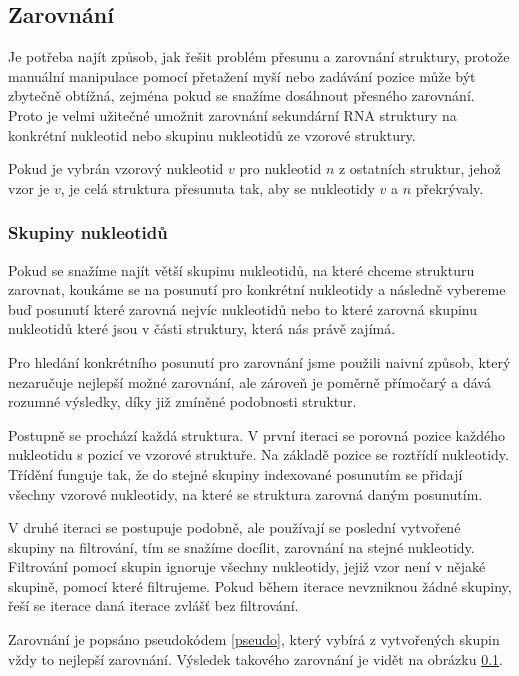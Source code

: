 \subsection{Zarovnání} \label{zarovnani}

Je potřeba najít způsob, jak řešit problém přesunu a zarovnání struktury,
protože manuální manipulace pomocí přetažení myší nebo zadávání pozice může být
zbytečně obtížná, zejména pokud se snažíme dosáhnout přesného zarovnání. Proto
je velmi užitečné umožnit zarovnání sekundární RNA struktury na konkrétní
nukleotid nebo skupinu nukleotidů ze vzorové struktury. 

Pokud je vybrán vzorový nukleotid $v$ pro nukleotid $n$ z ostatních struktur,
jehož vzor je $v$, je celá struktura přesunuta tak, aby se nukleotidy $v$ a $n$
překrývaly. 

\subsubsection{Skupiny nukleotidů}

Pokud se snažíme najít větší skupinu nukleotidů, na které chceme strukturu
zarovnat, koukáme se na posunutí pro konkrétní nukleotidy a následně vybereme
buď posunutí které zarovná nejvíc nukleotidů nebo to které zarovná skupinu
nukleotidů které jsou v části struktury, která nás právě zajímá.

Pro hledání konkrétního posunutí pro zarovnání jsme použili naivní způsob,
který nezaručuje nejlepší možné zarovnání, ale zároveň je poměrně přímočarý a
dává rozumné výsledky, díky již zmíněné podobnosti struktur.

Postupně se prochází každá struktura. V první iteraci se porovná pozice každého
nukleotidu s pozicí ve vzorové struktuře. Na základě pozice se roztřídí
nukleotidy. Třídění funguje tak, že do stejné skupiny indexované posunutím se
přidají všechny vzorové nukleotidy, na které se struktura zarovná daným posunutím.

V druhé iteraci se postupuje podobně, ale používají se poslední vytvořené
skupiny na filtrování, tím se snažíme docílit, zarovnání na stejné nukleotidy.
Filtrování pomocí skupin ignoruje všechny nukleotidy, jejiž vzor není v nějaké
skupině, pomocí které filtrujeme. Pokud během iterace nevzniknou žádné skupiny,
řeší se iterace daná iterace zvlášť bez filtrování.

Zarovnání je popsáno pseudokódem \ref{pseudo}, který vybírá z vytvořených
skupin vždy to nejlepší zarovnání. Výsledek takového zarovnání je vidět na
obrázku \ref{zarovnani}.

